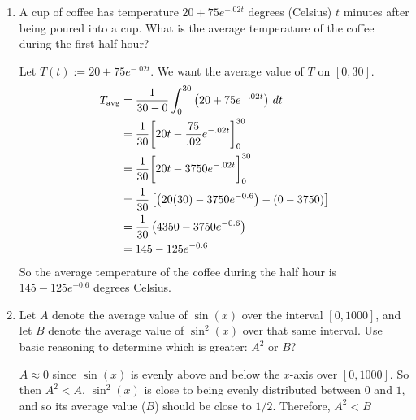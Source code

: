 \documentclass[nooutcomes]{ximera}
\begin{document}
\begin{problem}
	\begin{enumerate}
	
	\item  A cup of coffee has temperature $20 + 75e^{-.02t}$ degrees (Celsius) $t$ minutes after being poured into a cup.  
	What is the average temperature of the coffee during the first half hour?
		\begin{freeResponse}
		Let $T(t) := 20 + 75e^{-.02t}$.  We want the average value of $T$ on $[0,30]$.
			\begin{align*}
			T_{\text{avg}} &= \frac{1}{30-0} \int_0^{30} \left( 20 + 75e^{-.02t} \right) \,d t  \\
			&= \frac{1}{30} \bigg[ 20t - \frac{75}{.02} e^{-.02t} \bigg]_0^{30}  \\
			&= \frac{1}{30} \bigg[ 20t - 3750 e^{-.02t} \bigg]_0^{30}  \\
			&= \frac{1}{30} \left[ \left( 20(30) - 3750e^{-0.6} \right) - (0 - 3750) \right]  \\
			&= \frac{1}{30} \left( 4350 - 3750e^{-0.6} \right)  \\
			&= 145 - 125e^{-0.6} 
			\end{align*}
		So the average temperature of the coffee during the half hour is $145 - 125e^{-0.6}$ degrees Celsius.
		\end{freeResponse}
		
		
		
	\item  Let $A$ denote the average value of $\sin(x)$ over the interval $[0,1000]$, 
	and let $B$ denote the average value of $\sin^2(x)$ over that same interval.  
	Use basic reasoning to determine which is greater:  $A^2$ or $B$?  
		\begin{freeResponse}
		$A \approx 0$ since $\sin(x)$ is evenly above and below the $x$-axis over $[0,1000]$.  
		So then $A^2 < A$.  
		$\sin^2(x)$ is close to being evenly distributed between $0$ and $1$, and so its average value ($B$) should be close to $1/2$.  
		Therefore, $A^2 < B$
		\end{freeResponse}
		
		
		
	\end{enumerate}
		
		
		

\end{problem}
	
	
	
	
	
\end{document}
